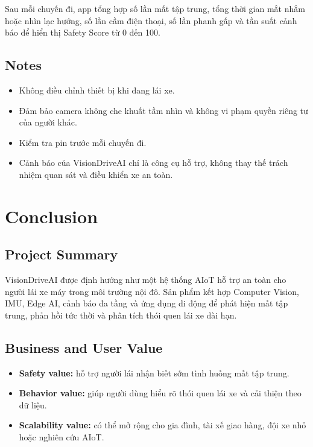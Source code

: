 \documentclass[12pt,a4paper]{article}
\begin{document}
Sau mỗi chuyến đi, app tổng hợp số lần mất tập trung, tổng thời gian mắt nhắm hoặc nhìn lạc hướng, số lần cầm điện thoại, số lần phanh gấp và tần suất cảnh báo để hiển thị Safety Score từ 0 đến 100.

\subsection{Notes}

\begin{itemize}
    \item Không điều chỉnh thiết bị khi đang lái xe.
    \item Đảm bảo camera không che khuất tầm nhìn và không vi phạm quyền riêng tư của người khác.
    \item Kiểm tra pin trước mỗi chuyến đi.
    \item Cảnh báo của VisionDriveAI chỉ là công cụ hỗ trợ, không thay thế trách nhiệm quan sát và điều khiển xe an toàn.
\end{itemize}

\newpage
\section{Conclusion}

\subsection{Project Summary}

VisionDriveAI được định hướng như một hệ thống AIoT hỗ trợ an toàn cho người lái xe máy trong môi trường nội đô. Sản phẩm kết hợp Computer Vision, IMU, Edge AI, cảnh báo đa tầng và ứng dụng di động để phát hiện mất tập trung, phản hồi tức thời và phân tích thói quen lái xe dài hạn.

\subsection{Business and User Value}

\begin{itemize}
    \item \textbf{Safety value:} hỗ trợ người lái nhận biết sớm tình huống mất tập trung.
    \item \textbf{Behavior value:} giúp người dùng hiểu rõ thói quen lái xe và cải thiện theo dữ liệu.
    \item \textbf{Scalability value:} có thể mở rộng cho gia đình, tài xế giao hàng, đội xe nhỏ hoặc nghiên cứu AIoT.
\end{itemize}
\end{document}
